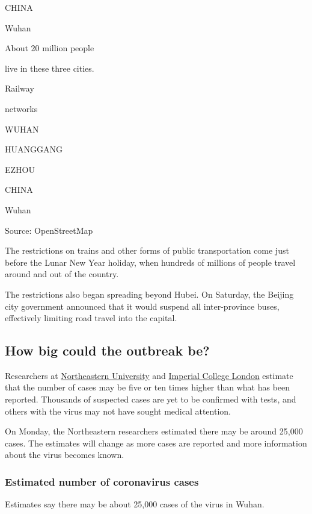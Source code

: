 CHINA

Wuhan

About 20 million people

live in these three cities.

Railway

networks

WUHAN

HUANGGANG

EZHOU

CHINA

Wuhan

Source: OpenStreetMap

The restrictions on trains and other forms of public transportation come
just before the Lunar New Year holiday, when hundreds of millions of
people travel around and out of the country.

The restrictions also began spreading beyond Hubei. On Saturday, the
Beijing city government announced that it would suspend all
inter-province buses, effectively limiting road travel into the capital.

\hypertarget{how-big-could-the-outbreak-be}{%
\subsection{How big could the outbreak
be?}\label{how-big-could-the-outbreak-be}}

Researchers at
\href{https://www.mobs-lab.org/2019ncov.html}{Northeastern University}
and
\href{https://www.imperial.ac.uk/mrc-global-infectious-disease-analysis/news--wuhan-coronavirus/}{Imperial
College London} estimate that the number of cases may be five or ten
times higher than what has been reported. Thousands of suspected cases
are yet to be confirmed with tests, and others with the virus may not
have sought medical attention.

On Monday, the Northeastern researchers estimated there may be around
25,000 cases. The estimates will change as more cases are reported and
more information about the virus becomes known.

\hypertarget{estimated-number-of-coronavirus-cases}{%
\subsubsection{Estimated number of coronavirus
cases}\label{estimated-number-of-coronavirus-cases}}

Estimates say there may be about 25,000 cases of the virus in Wuhan.

